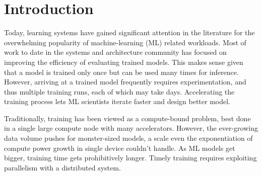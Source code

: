 \section{Introduction}
Today, learning systems have gained significant attention in the literature for the overwhelming popularity of machine-learning (ML) related workloads. Most of work to date in the systems and architecture community has focused on improving the efficiency of evaluating trained models. This makes sense given that a model is trained only once but can be used many times for inference. However, arriving at a trained model frequently requires experimentation, and thus multiple training runs, each of which may take days. Accelerating the training process lets ML scientists iterate faster and design better model.

Traditionally, training has been viewed as a compute-bound problem, best done in a single large compute node with many accelerators. However, the ever-growing data volume pushes for monster-sized models, a scale even the exponentiation of compute power growth in single device couldn't handle. As ML models get bigger, training time gets prohibitively longer. Timely training requires exploiting parallelism with a distributed system.

